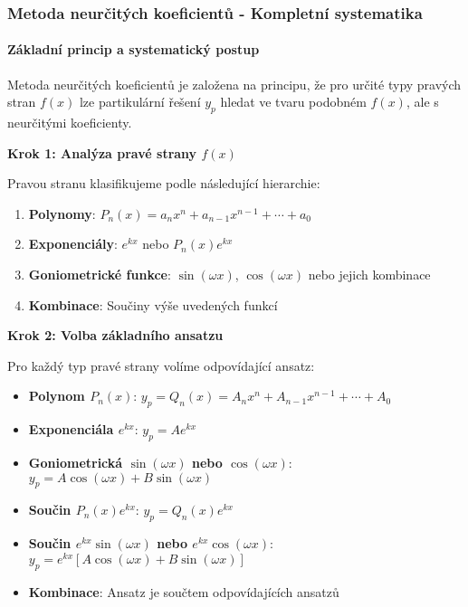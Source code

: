 \subsubsection{Metoda neurčitých koeficientů - Kompletní systematika}
\label{subsubsec:metoda-neurcitych-koeficientu}

\paragraph{Základní princip a systematický postup}

Metoda neurčitých koeficientů je založena na principu, že pro určité typy pravých stran $f(x)$ lze partikulární řešení $y_p$ hledat ve tvaru podobném $f(x)$, ale s neurčitými koeficienty.

\vspace{1\baselineskip}

\noindent\textbf{Krok 1: Analýza pravé strany $f(x)$}

Pravou stranu klasifikujeme podle následující hierarchie:

\begin{enumerate}
\item \textbf{Polynomy}: $P_n(x) = a_nx^n + a_{n-1}x^{n-1} + \cdots + a_0$
\item \textbf{Exponenciály}: $e^{kx}$ nebo $P_n(x)e^{kx}$
\item \textbf{Goniometrické funkce}: $\sin(\omega x)$, $\cos(\omega x)$ nebo jejich kombinace
\item \textbf{Kombinace}: Součiny výše uvedených funkcí
\end{enumerate}

\vspace{1\baselineskip}

\noindent\textbf{Krok 2: Volba základního ansatzu}

Pro každý typ pravé strany volíme odpovídající ansatz:

\begin{itemize}
\item \textbf{Polynom $P_n(x)$}: $y_p = Q_n(x) = A_nx^n + A_{n-1}x^{n-1} + \cdots + A_0$
\item \textbf{Exponenciála $e^{kx}$}: $y_p = Ae^{kx}$
\item \textbf{Goniometrická $\sin(\omega x)$ nebo $\cos(\omega x)$}: $y_p = A\cos(\omega x) + B\sin(\omega x)$
\item \textbf{Součin $P_n(x)e^{kx}$}: $y_p = Q_n(x)e^{kx}$
\item \textbf{Součin $e^{kx}\sin(\omega x)$ nebo $e^{kx}\cos(\omega x)$}: $y_p = e^{kx}[A\cos(\omega x) + B\sin(\omega x)]$
\item \textbf{Kombinace}: Ansatz je součtem odpovídajících ansatzů
\end{itemize}

